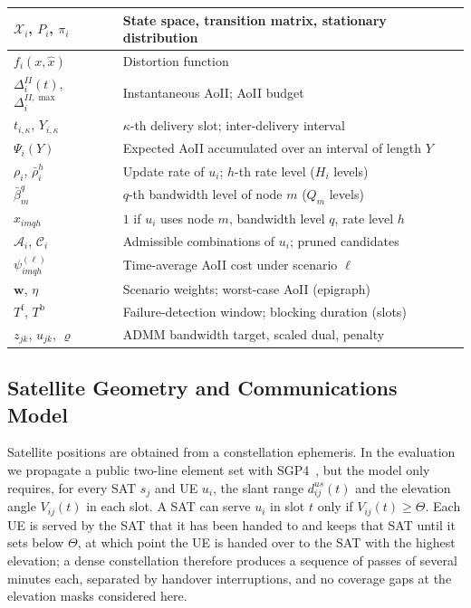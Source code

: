 \begin{table}[!t]
\begin{tabular}{|p{}|p{}|}
\hline
$\mathcal{X}_i$, $P_i$, $\pi_i$ & State space, transition matrix, stationary distribution \\
\hline
$f_i(x,\hat{x})$ & Distortion function \\
\hline
$\Delta_i^{II}(t)$, $\Delta_i^{II,\max}$ & Instantaneous AoII; AoII budget \\
\hline
$t_{i,\kappa}$, $Y_{i,\kappa}$ & $\kappa$-th delivery slot; inter-delivery interval \\
\hline
$\Psi_i(Y)$ & Expected AoII accumulated over an interval of length $Y$ \\
\hline
$\rho_i$, $\bar\rho_i^{h}$ & Update rate of $u_i$; $h$-th rate level ($H_i$ levels) \\
\hline
$\bar\beta_m^{q}$ & $q$-th bandwidth level of node $m$ ($Q_m$ levels) \\
\hline
$x_{imqh}$ & $1$ if $u_i$ uses node $m$, bandwidth level $q$, rate level $h$ \\
\hline
$\mathscr{A}_i$, $\mathscr{C}_i$ & Admissible combinations of $u_i$; pruned candidates \\
\hline
$\psi^{(\ell)}_{imqh}$ & Time-average AoII cost under scenario $\ell$ \\
\hline
$\mathbf{w}$, $\eta$ & Scenario weights; worst-case AoII (epigraph) \\
\hline
$T^{\mathrm{f}}$, $T^{\mathrm{b}}$ & Failure-detection window; blocking duration (slots) \\
\hline
$z_{jk}$, $u_{jk}$, $\varrho$ & ADMM bandwidth target, scaled dual, penalty \\
\hline
\end{tabular}
\end{table}

\subsection{Satellite Geometry and Communications Model}

Satellite positions are obtained from a constellation ephemeris. In the evaluation we propagate a public two-line
element set with SGP4~\cite{Vallado2006}, but the model only requires, for every SAT $s_j$ and UE $u_i$, the slant
range $d^{us}_{ij}(t)$ and the elevation angle $V_{ij}(t)$ in each slot. A SAT can serve $u_i$ in slot $t$ only if
$V_{ij}(t)\geq\Theta$. Each UE is served by the SAT that it has been handed to and keeps that SAT until it sets below
$\Theta$, at which point the UE is handed over to the SAT with the highest elevation; a dense constellation therefore
produces a sequence of passes of several minutes each, separated by handover interruptions, and no coverage gaps at
the elevation masks considered here.

